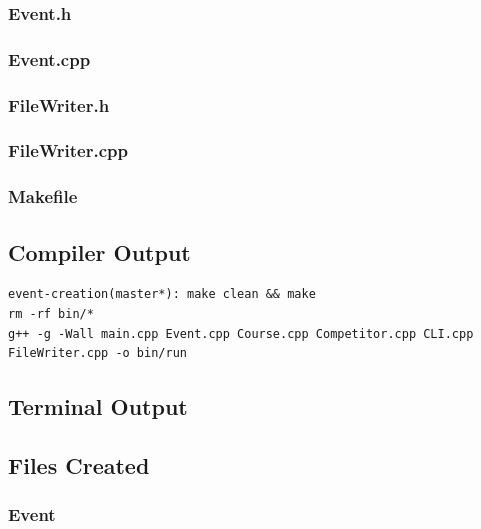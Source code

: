 \documentclass[10pt, a4paper]{article}
\begin{document}
\subsubsection{Event.h}


\subsubsection{Event.cpp}


\subsubsection{FileWriter.h}


\subsubsection{FileWriter.cpp}


\subsubsection{Makefile}



\subsection{Compiler Output}
\begin{lstlisting}
event-creation(master*): make clean && make
rm -rf bin/*
g++ -g -Wall main.cpp Event.cpp Course.cpp Competitor.cpp CLI.cpp FileWriter.cpp -o bin/run

\end{lstlisting}

\subsection{Terminal Output}


\subsection{Files Created}

\subsubsection{Event}

\end{document}
